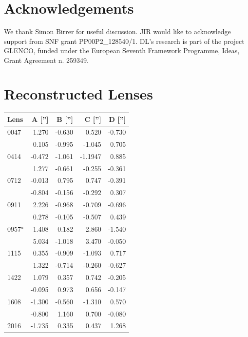 \documentclass[useAMS,usenatbib]{mn2e}
\begin{document}
\section{Acknowledgements}\label{sec:acknowledgements}
We thank Simon Birrer for useful discussion. JIR would like to acknowledge support from SNF grant PP00P2\_128540/1. DL's research is part of the project GLENCO, funded under the European Seventh Framework Programme, Ideas, Grant Agreement n. 259349.





\appendix
\section{Reconstructed Lenses}\label{sec:reconstructions}
\begin{table}
  \begin{center}
    \begin{tabular}{l r r r r}
      Lens & A [''] & B [''] & C [''] & D [''] \\ \hline
      0047 & 1.270 & -0.630 & 0.520 & -0.730 \\
           & 0.105 & -0.995 & -1.045 & 0.705 \\
      0414 & -0.472 & -1.061 & -1.1947 & 0.885 \\
           & 1.277 & -0.661 & -0.255 & -0.361 \\
      0712 & -0.013 & 0.795 & 0.747 & -0.391 \\
           & -0.804 & -0.156 & -0.292 & 0.307 \\
      0911 & 2.226 & -0.968 & -0.709 & -0.696 \\
           & 0.278 & -0.105 & -0.507 & 0.439 \\
      0957$^{a}$ & 1.408 & 0.182 & 2.860 & -1.540 \\
           & 5.034 & -1.018 & 3.470 & -0.050 \\
      1115 & 0.355 & -0.909 & -1.093 & 0.717 \\
           & 1.322 & -0.714 & -0.260 & -0.627 \\
      1422 & 1.079 & 0.357 & 0.742 & -0.205 \\
           & -0.095 & 0.973 & 0.656 & -0.147 \\
      1608 & -1.300 & -0.560 & -1.310 & 0.570 \\
           & -0.800 & 1.160 & 0.700 & -0.080 \\
      2016 & -1.735 & 0.335 & 0.437 & 1.268 \\

\end{tabular}
\end{center}
\end{table}
\end{document}
